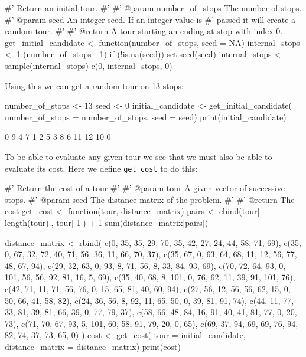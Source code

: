 \begin{Rin}
#' Return an initial tour.
#'
#' @param number_of_stops The number of stops.
#' @param seed An integer seed. If an integer value is
#'        passed it will create a random tour.
#'
#' @return A tour starting an ending at stop with index 0.
get_initial_candidate <- function(number_of_stops, seed = NA){
    internal_stops <- 1:(number_of_stops - 1)
    if (!is.na(seed)) {
      set.seed(seed)
      internal_stops <- sample(internal_stops)
    }
    c(0, internal_stops, 0)
}
\end{Rin}

Using this we can get a random tour on 13 stops:

\begin{Rin}
number_of_stops <- 13
seed <- 0
initial_candidate <- get_initial_candidate(
    number_of_stops = number_of_stops,
    seed = seed)
print(initial_candidate)
\end{Rin}

\begin{Rout}
 [1]  0  9  4  7  1  2  5  3  8  6 11 12 10  0
\end{Rout}

To be able to evaluate any given tour we see that we must also be able to
evaluate its cost. Here we define \texttt{get_cost} to do this:

\begin{Rin}
#' Return the cost of a tour
#'
#' @param tour A given vector of successive stops.
#' @param seed The distance matrix of the problem.
#'
#' @return The cost
get_cost <- function(tour, distance_matrix){
    pairs <-  cbind(tour[-length(tour)], tour[-1]) + 1
    sum(distance_matrix[pairs])
}
\end{Rin}

\begin{Rin}
distance_matrix <- rbind(
        c(0, 35, 35, 29, 70, 35, 42, 27, 24, 44, 58, 71, 69),
        c(35, 0, 67, 32, 72, 40, 71, 56, 36, 11, 66, 70, 37),
        c(35, 67, 0, 63, 64, 68, 11, 12, 56, 77, 48, 67, 94),
        c(29, 32, 63, 0, 93, 8, 71, 56, 8, 33, 84, 93, 69),
        c(70, 72, 64, 93, 0, 101, 56, 56, 92, 81, 16, 5, 69),
        c(35, 40, 68, 8, 101, 0, 76, 62, 11, 39, 91, 101, 76),
        c(42, 71, 11, 71, 56, 76, 0, 15, 65, 81, 40, 60, 94),
        c(27, 56, 12, 56, 56, 62, 15, 0, 50, 66, 41, 58, 82),
        c(24, 36, 56, 8, 92, 11, 65, 50, 0, 39, 81, 91, 74),
        c(44, 11, 77, 33, 81, 39, 81, 66, 39, 0, 77, 79, 37),
        c(58, 66, 48, 84, 16, 91, 40, 41, 81, 77, 0, 20, 73),
        c(71, 70, 67, 93, 5, 101, 60, 58, 91, 79, 20, 0, 65),
        c(69, 37, 94, 69, 69, 76, 94, 82, 74, 37, 73, 65, 0)
)
cost <- get_cost(
    tour = initial_candidate,
    distance_matrix = distance_matrix)
print(cost)
\end{Rin}

